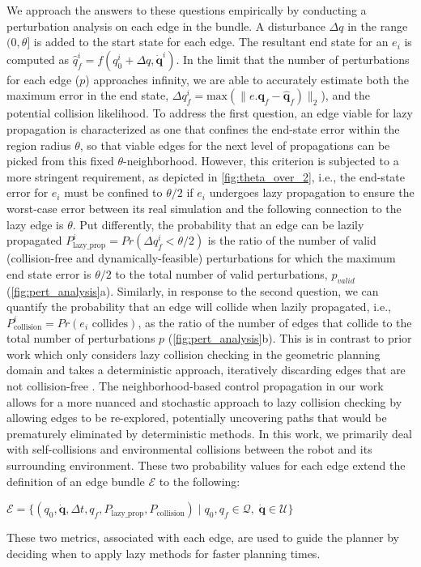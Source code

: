 We approach the answers to these questions empirically by conducting a perturbation analysis on each edge in the bundle. A disturbance $\Delta q$ in the range $(0, \theta]$ is added to the start state for each edge. The resultant end state for an $e_i$ is computed as $\hat{q}_f^i = f(q_0^i + \Delta q, \boldsymbol{\dot{q}}^i)$. In the limit that the number of perturbations for each edge ($p$) approaches infinity, we are able to accurately estimate both the maximum error in the end state, $\Delta q_f^i = \text{max}(\|e.\boldsymbol{q}_f - \hat{\boldsymbol{q}}_f)\|_2$), and the potential collision likelihood.
To address the first question, an edge viable for lazy propagation is characterized as one that confines the end-state error within the region radius $\theta$, so that viable edges for the next level of propagations can be picked from this fixed $\theta$-neighborhood.
However, this criterion is subjected to a more stringent requirement, as depicted in \cref{fig:theta_over_2}, i.e., the end-state error for $e_i$ must be confined to $\theta / 2$ if $e_i$ undergoes lazy propagation to ensure the worst-case error between its real simulation and the following connection to the lazy edge is $\theta$.
Put differently, the probability that an edge can be lazily propagated $P_{\text{lazy\_prop}}^i = Pr(\Delta q_f^i < \theta / 2)$ is the ratio of the number of valid (collision-free and dynamically-feasible) perturbations for which the maximum end state error is $\theta / 2$ to the total number of valid perturbations, $p_{valid}$ (\cref{fig:pert_analysis}a).
Similarly, in response to the second question, we can quantify the probability that an edge will collide when lazily propagated, i.e., $P_{\text{collision}}^i = Pr(e_i \text{ collides})$, as the ratio of the number of edges that collide to the total number of perturbations $p$ (\cref{fig:pert_analysis}b). This is in contrast to prior work which only considers lazy collision checking in the geometric planning domain and takes a deterministic approach, iteratively discarding edges that are not collision-free \cite{kavraki2000path,hauser2015lazy}. The neighborhood-based control propagation in our work allows for a more nuanced and stochastic approach to lazy collision checking by allowing edges to be re-explored, potentially uncovering paths that would be prematurely eliminated by deterministic methods. In this work, we primarily deal with self-collisions and environmental collisions between the robot and its surrounding environment.
These two probability values for each edge extend the definition of an edge bundle $\mathcal{E}$ to the following:
\begin{center}
$\mathcal{E} = \{(q_0, \boldsymbol{\dot{q}}, \Delta t, q_f, P_{\text{lazy\_prop}}, P_{\text{collision}}) \mid q_0, q_f \in \mathcal{Q}, \hspace{3pt} \boldsymbol{\dot{q}} \in \mathcal{U}\}$
\end{center}

These two metrics, associated with each edge, are used to guide the planner by deciding when to apply lazy methods for faster planning times.
